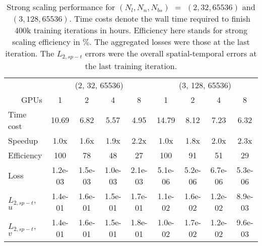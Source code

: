 \begin{table}[hbt!]
\centering
\singlespacing
\caption[
    PINNs, 2D TGV, $Re=100$: strong scaling performance for $(N_l, N_n, N_{bs})=(2, 32, 65536)$ and $(3, 128, 65536)$
]{
    Strong scaling performance for $(N_l, N_n, N_{bs})$ $=$ $(2, 32, 65536)$ and $(3, 128, 65536)$.%
    Time costs denote the wall time required to finish 400k training iterations in hours.%
    Efficiency here stands for strong scaling efficiency in $\%$.%
    The aggregated losses were those at the last iteration.%
    The $L_{2,sp-t}$ errors were the overall spatial-temporal errors at the last training iteration.%
}
\label{table:strong-scaling-perf}
\begin{tabular}{lcccccccc}
\toprule
 & \multicolumn{4}{c}{(2, 32, 65536)} & \multicolumn{4}{c}{(3, 128, 65536)} \\
\cmidrule(rl){2-5} \cmidrule(rl){6-9}
\multicolumn{1}{r}{GPUs} & 1 & 2 & 4 & 8 & 1 & 2 & 4 & 8 \\
\midrule
Time cost & 10.69 &  6.82 &  5.57 &  4.95 & 14.79 &  8.12 &  7.23 &  6.32 \\
\addlinespace
Speedup & 1.0x & 1.6x & 1.9x & 2.2x & 1.0x & 1.8x & 2.0x & 2.3x \\
\addlinespace
Efficiency & 100 & 78 & 48 & 27 & 100 & 91 & 51 & 29 \\
\addlinespace
Loss & 1.2e-03 & 1.5e-03 & 1.0e-03 & 2.1e-03 & 5.1e-06 & 5.2e-06 & 6.7e-06 & 5.3e-06 \\
\addlinespace
$L_{2,sp-t}$, $u$ & 1.4e-01 & 1.6e-01 & 1.5e-01 & 1.7e-01 & 1.1e-02 & 1.6e-02 & 1.2e-02 & 8.9e-03 \\
\addlinespace
$L_{2,sp-t}$, $v$ & 1.4e-01 & 1.6e-01 & 1.5e-01 & 1.8e-01 & 1.0e-02 & 1.7e-02 & 1.2e-02 & 9.6e-03 \\
\bottomrule
\end{tabular}
\end{table}
